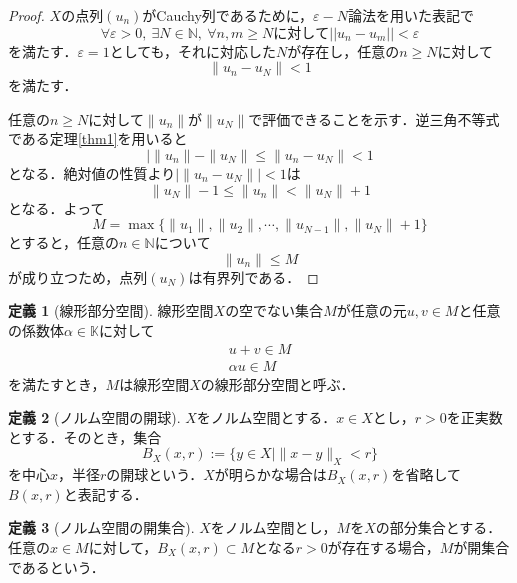 \documentclass[11pt,a4paper,titlepage]{jsreport}
\theoremstyle{definition}
\newtheorem{dfn}{定義}
\begin{document}
\begin{proof}
  $X$の点列$(u_n)$がCauchy列であるために，$\varepsilon -N$論法を用いた表記で
  \begin{equation*}
    \forall\varepsilon >0, \ \exists N\in \mathbb{N}, \ \forall n,m \geq Nに対して||u_n-u_m||<\varepsilon
  \end{equation*}
  を満たす．$\varepsilon=1$としても，それに対応した$N$が存在し，任意の$n\geq N$に対して
  \begin{equation*}
    \|u_n-u_N\|<1
  \end{equation*}
  を満たす．

  任意の$n\geq N$に対して$\|u_n\|$が$\|u_N\|$で評価できることを示す．逆三角不等式である定理\ref{thm1}を用いると
  \begin{equation*}
    |\|u_n\|-\|u_N\|\leq \|u_n-u_N\|<1
  \end{equation*}
  となる．絶対値の性質より$|\|u_n-u_N\||<1$は
  \begin{equation*}
    \|u_N\|-1\leq\|u_n\|<\|u_N\|+1
  \end{equation*}
  となる．よって
  \begin{equation*}
    M=\max\{\|u_1\|,\|u_2\|,\cdots,\|u_{N-1}\|,\|u_N\|+1\}
  \end{equation*}
  とすると，任意の$n\in \mathbb{N}について$
  \begin{equation*}
    \|u_n\|\leq M
  \end{equation*}
  が成り立つため，点列$(u_N)$は有界列である．
\end{proof}

\begin{dfn}[線形部分空間]
  線形空間$X$の空でない集合$M$が任意の元$u,v\in M$と任意の係数体$\alpha\in\mathbb{K}$に対して
  \begin{align*}
    u+v\in M \\
    \alpha u \in M
  \end{align*}
  を満たすとき，$M$は線形空間$X$の線形部分空間と呼ぶ．
\end{dfn}

\begin{dfn}[ノルム空間の開球]
  $X$をノルム空間とする．$x\in X$とし，$r>0$を正実数とする．そのとき，集合
  \begin{equation*}
    B_X(x,r):=\{y\in X \mid \|x-y\|_X<r\}
  \end{equation*}
  を中心$x$，半径$r$の開球という．$X$が明らかな場合は$B_X(x,r)$を省略して$B(x,r)$と表記する．
\end{dfn}

\begin{dfn}[ノルム空間の開集合]
  $X$をノルム空間とし，$M$を$X$の部分集合とする．任意の$x\in M$に対して，$B_X(x,r)\subset M$となる$r>0$が存在する場合，$M$が開集合であるという．
\end{dfn}
\end{document}
